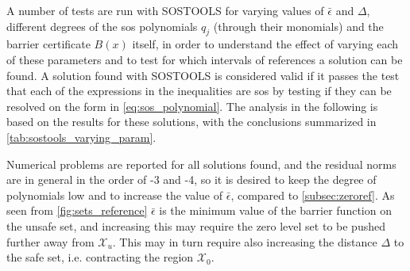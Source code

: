 A number of tests are run with SOSTOOLS for varying values of $\bar{\epsilon}$ and $\Delta$, different degrees of the \gls{sos} polynomials $q_j$ (through their monomials) and the barrier certificate $B(x)$ itself, in order to understand the effect of varying each of these parameters and to test for which intervals of references a solution can be found.
A solution found with SOSTOOLS is considered valid if it passes the test that each of the expressions in the inequalities are \gls{sos} by testing if they can be resolved on the form in \autoref{eq:sos_polynomial}. The analysis in the following is based on the results for these solutions, with the conclusions summarized in \autoref{tab:sostools_varying_param}.

Numerical problems are reported for all solutions found, and the residual norms are in general in the order of -3 and -4, so it is desired to keep the degree of polynomials low and to increase the value of $\bar{\epsilon}$, compared to \autoref{subsec:zeroref}. As seen from \autoref{fig:sets_reference} $\bar{\epsilon}$ is the minimum value of the barrier function on the unsafe set, and increasing this may require the zero level set to be pushed further away from $\mathcal{X}_u$. This may in turn require also increasing the distance $\Delta$ to the safe set, i.e. contracting the region $\mathcal{X}_0$.

